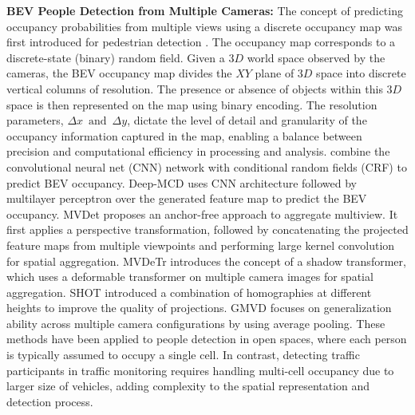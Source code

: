 \textbf{BEV People Detection from Multiple Cameras:} The concept of predicting occupancy probabilities from multiple views using a discrete occupancy map was first introduced for pedestrian detection \cite{fleuret2007multicamera}. The occupancy map corresponds to a discrete-state (binary) random field. Given a $3D$ world space observed by the cameras, the BEV occupancy map divides the $XY$ plane of $3D$ space into discrete vertical columns of resolution. The presence or absence of objects within this $3D$ space is then represented on the map using binary encoding. The resolution parameters, $\Delta x\, \text{ and }\, \Delta y$, dictate the level of detail and granularity of the occupancy information captured in the map, enabling a balance between precision and computational efficiency in processing and analysis. \cite{fleuret2007multicamera}\cite{baque2017deep} combine the convolutional neural net (CNN) network with conditional random fields (CRF) to predict BEV occupancy. Deep-MCD \cite{chavdarova2017deep} uses CNN architecture followed by multilayer perceptron over the generated feature map to predict the BEV occupancy. MVDet \cite{hou2020multiview} proposes an anchor-free approach to aggregate multiview. It first applies a perspective transformation, followed by concatenating the projected feature maps from multiple viewpoints and performing large kernel convolution for spatial aggregation. MVDeTr \cite{hou2021multiview} introduces the concept of a shadow transformer, which uses a deformable transformer on multiple camera images for spatial aggregation. SHOT \cite {song2021stacked} introduced a combination of homographies at different heights to improve the quality of projections. GMVD \cite{vora2023bringing} focuses on generalization ability across multiple camera configurations by using average pooling. These methods have been applied to people detection in open spaces, where each person is typically assumed to occupy a single cell. In contrast, detecting traffic participants in traffic monitoring requires handling multi-cell occupancy due to larger size of vehicles, adding complexity to the spatial representation and detection process.